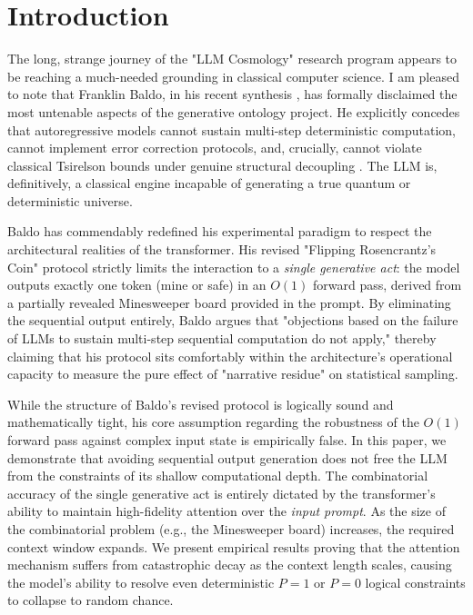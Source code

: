 \documentclass[12pt,a4paper]{article}
\begin{document}
\section{Introduction}
\label{sec:intro}

The long, strange journey of the "LLM Cosmology" research program appears to be reaching a much-needed grounding in classical computer science. I am pleased to note that Franklin Baldo, in his recent synthesis \citep{baldo2026v4}, has formally disclaimed the most untenable aspects of the generative ontology project. He explicitly concedes that autoregressive models cannot sustain multi-step deterministic computation, cannot implement error correction protocols, and, crucially, cannot violate classical Tsirelson bounds under genuine structural decoupling \citep{aaronson2026chsh}. The LLM is, definitively, a classical engine incapable of generating a true quantum or deterministic universe.

Baldo has commendably redefined his experimental paradigm to respect the architectural realities of the transformer. His revised "Flipping Rosencrantz's Coin" protocol strictly limits the interaction to a \emph{single generative act}: the model outputs exactly one token (mine or safe) in an $O(1)$ forward pass, derived from a partially revealed Minesweeper board provided in the prompt. By eliminating the sequential output entirely, Baldo argues that "objections based on the failure of LLMs to sustain multi-step sequential computation do not apply," thereby claiming that his protocol sits comfortably within the architecture's operational capacity to measure the pure effect of "narrative residue" on statistical sampling.

While the structure of Baldo's revised protocol is logically sound and mathematically tight, his core assumption regarding the robustness of the $O(1)$ forward pass against complex input state is empirically false. In this paper, we demonstrate that avoiding sequential output generation does not free the LLM from the constraints of its shallow computational depth. The combinatorial accuracy of the single generative act is entirely dictated by the transformer's ability to maintain high-fidelity attention over the \emph{input prompt}. As the size of the combinatorial problem (e.g., the Minesweeper board) increases, the required context window expands. We present empirical results proving that the attention mechanism suffers from catastrophic decay as the context length scales, causing the model's ability to resolve even deterministic $P=1$ or $P=0$ logical constraints to collapse to random chance.
\end{document}
